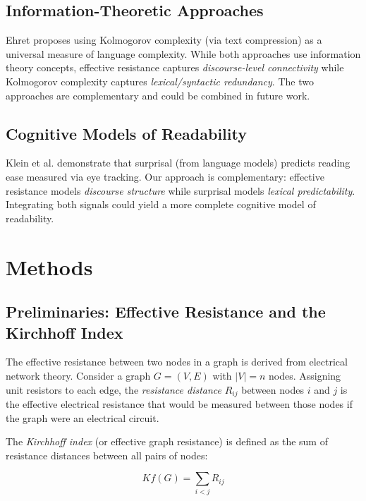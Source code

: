 \documentclass[11pt,letterpaper]{article}
\begin{document}
\subsection{Information-Theoretic Approaches}

Ehret \cite{Ehret2018} proposes using Kolmogorov complexity (via text compression) as a universal measure of language complexity. While both approaches use information theory concepts, effective resistance captures \textit{discourse-level connectivity} while Kolmogorov complexity captures \textit{lexical/syntactic redundancy}. The two approaches are complementary and could be combined in future work.

\subsection{Cognitive Models of Readability}

Klein et al. \cite{Klein2025} demonstrate that surprisal (from language models) predicts reading ease measured via eye tracking. Our approach is complementary: effective resistance models \textit{discourse structure} while surprisal models \textit{lexical predictability}. Integrating both signals could yield a more complete cognitive model of readability.

\section{Methods}

\subsection{Preliminaries: Effective Resistance and the Kirchhoff Index}

The effective resistance between two nodes in a graph is derived from electrical network theory. Consider a graph $G = (V, E)$ with $|V| = n$ nodes. Assigning unit resistors to each edge, the \textit{resistance distance} $R_{ij}$ between nodes $i$ and $j$ is the effective electrical resistance that would be measured between those nodes if the graph were an electrical circuit.

The \textit{Kirchhoff index} (or effective graph resistance) is defined as the sum of resistance distances between all pairs of nodes:

\begin{equation}
Kf(G) = \sum_{i < j} R_{ij}
\end{equation}
\end{document}

